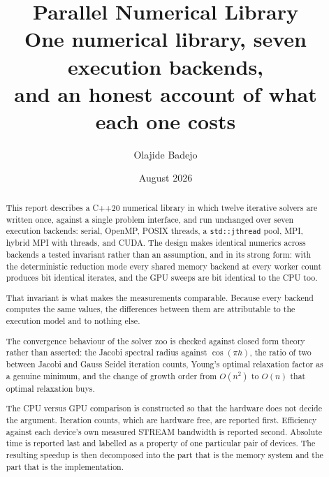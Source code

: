 \documentclass[11pt,a4paper]{report}
\title{\textbf{Parallel Numerical Library}\\[0.4em]
  \large One numerical library, seven execution backends,\\
  and an honest account of what each one costs}
\author{Olajide Badejo}
\date{August 2026}
\begin{document}
\maketitle

\begin{abstract}
\noindent
This report describes a C++20 numerical library in which twelve iterative
solvers are written once, against a single problem interface, and run unchanged
over seven execution backends: serial, OpenMP, POSIX threads, a
\texttt{std::jthread} pool, MPI, hybrid MPI with threads, and CUDA. The design
makes identical numerics across backends a tested invariant rather than an
assumption, and in its strong form: with the deterministic reduction mode every
shared memory backend at every worker count produces bit identical iterates, and
the GPU sweeps are bit identical to the CPU too.

That invariant is what makes the measurements comparable. Because every backend
computes the same values, the differences between them are attributable to the
execution model and to nothing else.

The convergence behaviour of the solver zoo is checked against closed form
theory rather than asserted: the Jacobi spectral radius against
$\cos(\pi h)$, the ratio of two between Jacobi and Gauss Seidel iteration
counts, Young's optimal relaxation factor as a genuine minimum, and the change
of growth order from $O(n^2)$ to $O(n)$ that optimal relaxation buys.

The CPU versus GPU comparison is constructed so that the hardware does not
decide the argument. Iteration counts, which are hardware free, are reported
first. Efficiency against each device's own measured STREAM bandwidth is
reported second. Absolute time is reported last and labelled as a property of
one particular pair of devices. The resulting speedup is then decomposed into
the part that is the memory system and the part that is the implementation.
\end{abstract}

\tableofcontents











\end{document}
